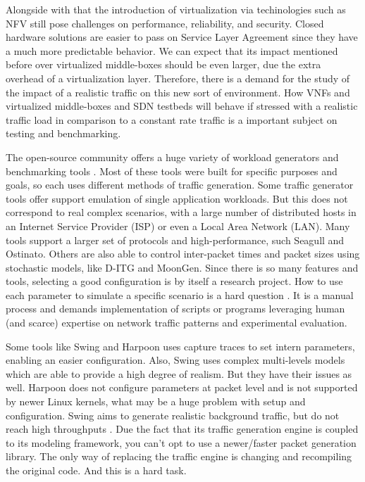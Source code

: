 Alongside with that the introduction of virtualization via techinologies such as NFV  still pose challenges on performance,  reliability, and security\cite{nfv-challenges}. Closed hardware solutions are easier to pass on Service Layer Agreement since they have a much more predictable behavior. We can expect that its impact mentioned before over virtualized middle-boxes should be even larger, due the extra overhead of a virtualization layer. Therefore, there is a demand for the study of the impact of a realistic traffic on this new sort of environment. How VNFs and virtualized middle-boxes and SDN testbeds will behave if stressed with a realistic traffic load in comparison to a constant rate traffic is a important subject on testing and benchmarking. 


The open-source community offers a huge variety of workload generators and benchmarking tools \cite{ditg-paper}\cite{validate-trafficgen}\cite{comparative-trafficgen-tools}\cite{performance-trafficgen}. Most of these tools were built for specific purposes and goals, so each uses different methods of traffic generation. Some traffic generator tools offer support emulation of single application workloads. But this does not correspond to real complex scenarios, with a large number of distributed hosts in an Internet Service Provider (ISP) or even a Local Area Network (LAN). Many tools support a larger set of protocols and high-performance, such Seagull and Ostinato. Others are also able to control inter-packet times and packet sizes using stochastic models, like D-ITG\cite{ditg-paper} and MoonGen. Since there is so many features and tools, selecting a good configuration is by itself a research project. How to use each parameter to simulate a specific scenario is a hard question \cite{legotg-paper}\cite{selfsimilar-ethernet}. It is a manual process and demands implementation of scripts or programs leveraging human (and scarce) expertise on network traffic patterns and experimental evaluation.



Some tools like Swing and Harpoon uses capture traces to set intern parameters, enabling an easier configuration. Also, Swing uses complex multi-levels models which are able to provide a high degree of realism\cite{swing-paper}. But they have their issues as well. Harpoon does not configure parameters at packet level\cite{harpoon-paper} and is not supported by newer Linux kernels, what may be a huge problem with setup and configuration. Swing\cite{swing-paper} aims to generate realistic background traffic, but do not reach high throughputs \cite{swing-paper} \cite{legotg-paper}. Due the fact that its traffic generation engine is coupled to its modeling framework, you can't opt to use a newer/faster packet generation library. The only way of replacing the traffic engine is changing and recompiling the original code. And this is a hard task.


